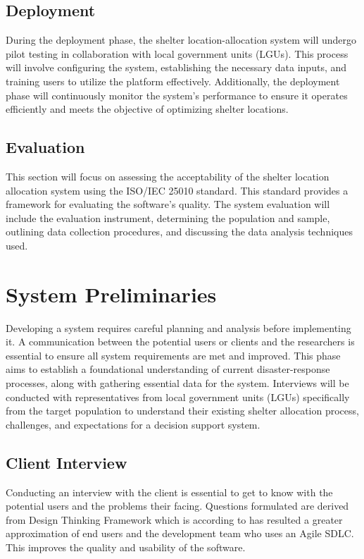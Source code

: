 \subsection{Deployment}
	During the deployment phase, the shelter location-allocation system will undergo pilot testing in collaboration with local government units (LGUs). This process will involve configuring the system, establishing the necessary data inputs, and training users to utilize the platform effectively. Additionally, the deployment phase will continuously monitor the system's performance to ensure it operates efficiently and meets the objective of optimizing shelter locations. 
	
\subsection{Evaluation}
	This section will focus on assessing the acceptability of the shelter location allocation system using the ISO/IEC 25010 standard. This standard provides a framework for evaluating the software's quality. The system evaluation will include the evaluation instrument, determining the population and sample, outlining data collection procedures, and discussing the data analysis techniques used.

\section{System Preliminaries}
	Developing a system requires careful planning and analysis before implementing it. A communication between the potential users or clients and the researchers is essential to ensure all system requirements are met and improved. This phase aims to establish a foundational understanding of current disaster-response processes, along with gathering essential data for the system. Interviews will be conducted with representatives from local government units (LGUs) specifically from the target population to understand their existing shelter allocation process, challenges, and expectations for a decision support system. 
	
\subsection{Client Interview}
	Conducting an interview with the client is essential to get to know with the potential users and the problems their facing. Questions formulated are derived from Design Thinking Framework which is according to \textcite{Julio2018} has resulted a greater approximation of end users and the development team who uses an Agile SDLC. This improves the quality and usability of the software.
	
